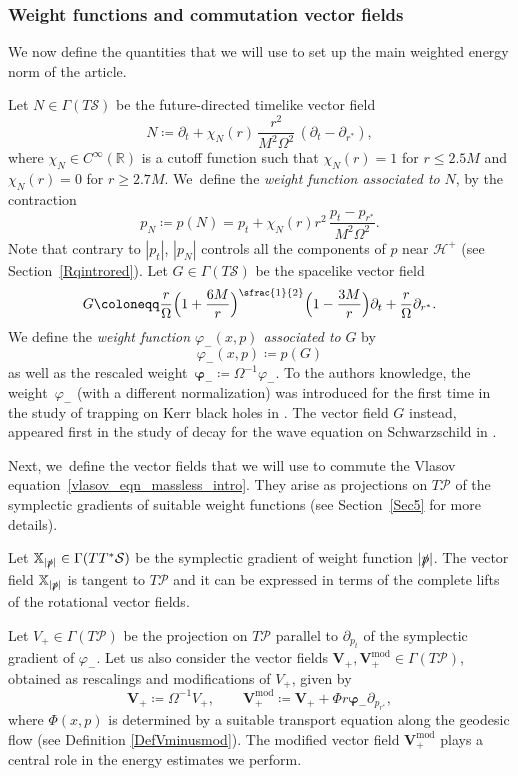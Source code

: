 \documentclass[10pt]{amsart}
\theoremstyle{plain}
\theoremstyle{definition}
\newcommand\R{{\mathbb{R}}}
\newcommand\T{{\mathbb{X}}}
\renewcommand\H{{\mathcal{H}^+}}
\begin{document}
\subsubsection{Weight functions and commutation vector fields}

We now define the quantities that we will use to set up the main weighted energy norm of the article.

Let $N\in \Gamma(T\mathcal{S})$ be the future-directed timelike vector field
\[
N \coloneqq \partial_t+ \chi_N (r)\, \frac{r^2}{M^2\Omega^2}\, (\partial_t-\partial_{r^*}),
\]
where $\chi_N \in C^\infty (\R)$ is a cutoff function such that $\chi_N (r)=1$ for $r \leq 2.5M$ and $\chi_N (r) =0$ for $r \geq 2.7M$. We~define the \emph{weight function associated to} $N$, by the contraction
\[
p_N\coloneqq p(N)=p_t+\chi_N (r) r^2 \, \frac{p_t-p_{r^*}}{M^2\Omega^2}.
\]
Note that contrary to $|p_t|$, $|p_N|$ controls all the components of $p$ near $\H$ (see Section~\ref{Rqintrored}). Let $G\in \Gamma(T\mathcal{S})$ be the spacelike vector field
\begin{equation}\label{defG}
G\coloneqq \frac{r}{\Omega}\Bigl(1+\frac{6M}{r}\Bigr)^{\sfrac{1}{2}}\Bigl(1-\frac{3M}{r}\Bigr)\partial_t + \frac{r }{\Omega} \partial_{r^*}.
\end{equation}
We define the \emph{weight function $\varphi_- (x,p)$ associated to} $G$ by
\begin{equation}\label{eq:defvarphiminusintro}
\varphi_-(x,p)\coloneqq p(G)
\end{equation}
as well as the rescaled weight~$\pmb{\varphi}_-\coloneqq\Omega^{-1}\varphi_-$. To the authors knowledge, the weight~\(\varphi_-\) (with a different normalization) was introduced for the first time in the study of trapping on Kerr black holes in \cite{D15}. The vector field \(G\) instead, appeared first in the study of decay for the wave equation on Schwarzschild in \cite{GK23}.

Next, we~define the vector fields that we will use to commute the Vlasov equation~\eqref{vlasov_eqn_massless_intro}. They arise as projections on $T\mathcal{P}$ of the symplectic gradients of suitable weight functions (see Section~\ref{Sec5} for more details).

Let $\T_{|\slashed{p}|} \in \Gamma(TT^*\mathcal{S})$ be the symplectic gradient of weight function $|\slashed{p}|$. The vector field $\T_{|\slashed{p}|}$ is tangent to $T\mathcal{P}$ and it can be expressed in terms of the complete lifts of the rotational vector fields.

Let $V_+\in \Gamma(T\mathcal{P})$ be the projection on $T \mathcal{P}$ parallel to $\partial_{p_t}$ of the symplectic gradient of $\varphi_-$. Let us also consider the vector fields $\pmb{V}_+, \pmb{V}_+^{\mathrm{mod}} \in \Gamma(T \mathcal{P})$, obtained as rescalings and modifications of $V_+$, given by
\[
\pmb{V}_{\! +}\coloneqq \Omega^{-1} V_+,\qquad \pmb{V}_+^{\mathrm{mod}} \coloneqq \pmb{V}_{\! +}+\Phi r \pmb{\varphi}_- \partial_{p_{r^*}},
\]
where $\Phi(x,p)$ is determined by a suitable transport equation along the geodesic flow (see Definition \ref{DefVminusmod}). The modified vector field $\pmb{V}_+^{\mathrm{mod}}$ plays a central role in the energy estimates we perform.
\end{document}

